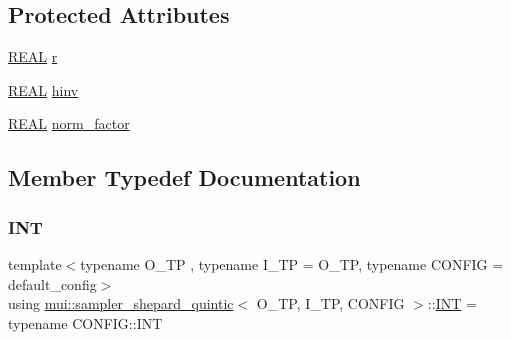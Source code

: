 \subsection*{Protected Attributes}
\begin{DoxyCompactItemize}
\item 
\hyperlink{classmui_1_1sampler__shepard__quintic_ae674072eac8556d3520cf5f6c1eb7ae6}{R\+E\+AL} \hyperlink{classmui_1_1sampler__shepard__quintic_a000dbbd67930c94b8a610470da33bc00}{r}
\item 
\hyperlink{classmui_1_1sampler__shepard__quintic_ae674072eac8556d3520cf5f6c1eb7ae6}{R\+E\+AL} \hyperlink{classmui_1_1sampler__shepard__quintic_a1984a2d5e479ef72588febdc198eaf6d}{hinv}
\item 
\hyperlink{classmui_1_1sampler__shepard__quintic_ae674072eac8556d3520cf5f6c1eb7ae6}{R\+E\+AL} \hyperlink{classmui_1_1sampler__shepard__quintic_a386c9bf1d7d9a735f2387d0634bf4ccb}{norm\+\_\+factor}
\end{DoxyCompactItemize}


\subsection{Member Typedef Documentation}
\mbox{\label{classmui_1_1sampler__shepard__quintic_abf26df87b157e23e13d25d52da1337b9}} 
\subsubsection{\texorpdfstring{I\+NT}{INT}}
{\footnotesize\ttfamily template$<$typename O\+\_\+\+TP , typename I\+\_\+\+TP  = O\+\_\+\+TP, typename C\+O\+N\+F\+IG  = default\+\_\+config$>$ \\
using \hyperlink{classmui_1_1sampler__shepard__quintic}{mui\+::sampler\+\_\+shepard\+\_\+quintic}$<$ O\+\_\+\+TP, I\+\_\+\+TP, C\+O\+N\+F\+IG $>$\+::\hyperlink{classmui_1_1sampler__shepard__quintic_abf26df87b157e23e13d25d52da1337b9}{I\+NT} =  typename C\+O\+N\+F\+I\+G\+::\+I\+NT}

\mbox{\label{classmui_1_1sampler__shepard__quintic_a449ad1b058df2448a50dab7822626fa6}} 
